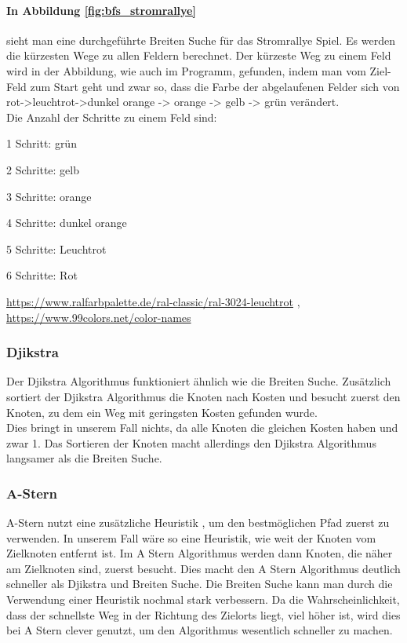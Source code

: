 \documentclass[a4paper,12pt,arial]{scrartcl}
\begin{document}
\paragraph{In Abbildung \ref{fig:bfs_stromrallye}}
 sieht man eine durchgeführte Breiten Suche für das Stromrallye Spiel. Es werden die kürzesten Wege zu allen Feldern berechnet. Der kürzeste Weg zu einem Feld wird in der Abbildung, wie auch im Programm, gefunden, indem man vom Ziel-Feld zum Start geht und zwar so, dass die Farbe der abgelaufenen Felder sich von rot->leuchtrot->dunkel orange -> orange -> gelb -> grün verändert.
\setlength{\itemsep}{-60pt}
\\
Die Anzahl der Schritte zu einem Feld sind:
\small
\begin{compactitem}
\item 1 Schritt: grün
\item 2 Schritte: gelb
\item 3 Schritte: orange
\item 4 Schritte: dunkel orange
\item 5 Schritte: Leuchtrot
\item 6 Schritte: Rot
\end{compactitem}
\tiny{ \url{https://www.ralfarbpalette.de/ral-classic/ral-3024-leuchtrot}}  , \tiny{\url{https://www.99colors.net/color-names}}
\normalsize
\subsubsection{Djikstra}
Der Djikstra Algorithmus funktioniert ähnlich wie die Breiten Suche. Zusätzlich sortiert der Djikstra Algorithmus die Knoten nach Kosten und besucht zuerst den Knoten, zu dem ein Weg mit geringsten Kosten gefunden wurde.
\\
Dies bringt in unserem Fall nichts, da alle Knoten die gleichen Kosten haben und zwar 1.  Das Sortieren der Knoten macht allerdings den Djikstra Algorithmus langsamer  als die Breiten Suche.
\subsubsection{A-Stern}
 A-Stern nutzt eine zusätzliche Heuristik , um den bestmöglichen Pfad zuerst zu verwenden.
In unserem Fall wäre so eine Heuristik, wie weit der Knoten vom Zielknoten entfernt ist. 
Im A Stern Algorithmus werden dann Knoten, die näher am Zielknoten sind, zuerst besucht.
Dies macht den A Stern Algorithmus deutlich schneller als Djikstra und Breiten Suche.
Die Breiten Suche kann man durch die Verwendung einer Heuristik nochmal stark verbessern.
Da die Wahrscheinlichkeit, dass der schnellste Weg in der Richtung des Zielorts liegt, viel höher ist, wird dies bei  A Stern clever genutzt, um den Algorithmus wesentlich schneller zu machen.
\end{document}

